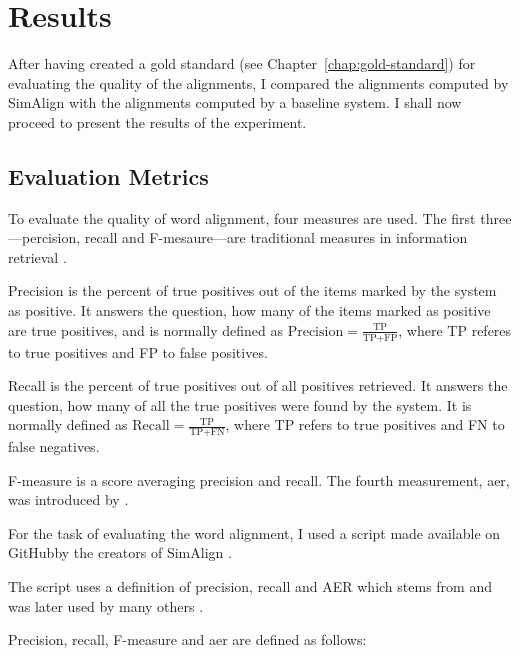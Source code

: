 \chapter{Results}

After having created a gold standard (see Chapter~\ref{chap:gold-standard}) for evaluating the quality of the alignments, I compared the alignments computed by SimAlign with the alignments computed by a baseline system.
I shall now proceed to present the results of the experiment.

\section{Evaluation Metrics}
To evaluate the quality of word alignment, four measures are used. 
The first three---percision, recall and F-mesaure---are traditional measures in information retrieval \autocite{mihalcea-pedersen-2003-evaluation}.

Precision is the percent of true positives out of the items marked by the system as positive. 
It answers the question, how many of the items marked as positive are true positives, and is normally defined as $\text{Precision}=\frac{\text{TP}}{\text{TP}+\text{FP}}$, where TP referes to true positives and FP to false positives.

Recall is the percent of true positives out of all positives retrieved. 
It answers the question, how many of all the true positives were found by the system. 
It is normally defined as $\text{Recall}=\frac{\text{TP}}{\text{TP}+\text{FN}}$, where TP refers to true positives and FN to false negatives.

F-measure is a score averaging precision and recall. 
The fourth measurement, \acrfull{aer}, was introduced by \cite{och-ney-2000-improved}. 

For the task of evaluating the word alignment, I used a script made available on GitHub\footnotemark by the creators of SimAlign \autocite{jalili-sabet-etal-2020-simalign}. 


The script uses a definition of precision, recall and AER which stems from \cite{och-ney-2000-improved} and was later used by many others \autocites{mihalcea-pedersen-2003-evaluation,och-ney-2003-systematic,Ostling2016efmaral,jalili-sabet-etal-2020-simalign}.

Precision, recall, F-measure and \acrshort{aer} are defined as follows:

